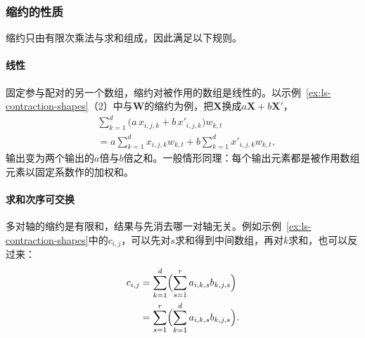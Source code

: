 \subsubsection{缩约的性质}

缩约只由有限次乘法与求和组成，因此满足以下规则。

\paragraph{线性}
固定参与配对的另一个数组，缩约对被作用的数组是线性的。以示例~\ref{ex:ls-contraction-shapes}（2）中与$\bm W$的缩约为例，把$\bm X$换成$a\bm X+b\bm X'$，
\[
 \begin{aligned}
 &\sum_{k=1}^d\bigl(a\,x_{i,j,k}+b\,x'_{i,j,k}\bigr)w_{k,t}\\
 &=a\sum_{k=1}^d x_{i,j,k}w_{k,t}+b\sum_{k=1}^d x'_{i,j,k}w_{k,t},
 \end{aligned}
\]
输出变为两个输出的$a$倍与$b$倍之和。一般情形同理：每个输出元素都是被作用数组元素以固定系数作的加权和。

\paragraph{求和次序可交换}
多对轴的缩约是有限和，结果与先消去哪一对轴无关。例如示例~\ref{ex:ls-contraction-shapes}中的$c_{i,j}$，可以先对$s$求和得到中间数组，再对$k$求和，也可以反过来：
\[
 \begin{aligned}
 c_{i,j}
 &=\sum_{k=1}^d\Bigl(\sum_{s=1}^r a_{i,k,s}b_{k,j,s}\Bigr)\\
 &=\sum_{s=1}^r\Bigl(\sum_{k=1}^d a_{i,k,s}b_{k,j,s}\Bigr).
 \end{aligned}
\]

